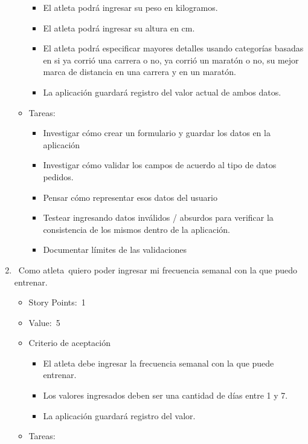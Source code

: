 \begin{enumerate}
\begin{itemize}
    \begin{itemize}
    \item
      El atleta podrá ingresar su peso en kilogramos.
    \item
      El atleta podrá ingresar su altura en cm.
    \item
      El atleta podrá especificar mayores detalles usando categorías
      basadas en si ya corrió una carrera o no, ya corrió un maratón o
      no, su mejor marca de distancia en una carrera y en un maratón.
    \item
      La aplicación guardará registro del valor actual de ambos datos.
    \end{itemize}
  \item
    Tareas:

    \begin{itemize}
    \item
      Investigar cómo crear un formulario y guardar los datos en la
      aplicación
    \item
      Investigar cómo validar los campos de acuerdo al tipo de datos
      pedidos.
    \item
      Pensar cómo representar esos datos del usuario
    \item
      Testear ingresando datos inválidos / absurdos para verificar la
      consistencia de los mismos dentro de la aplicación.
    \item
      Documentar límites de las validaciones
    \end{itemize}
  \end{itemize}
\item
  ~Como atleta~quiero poder ingresar mi frecuencia semanal con la que
  puedo entrenar.

  \begin{itemize}
  \item
    Story Points:~1
  \item
    Value:~5
  \item
    Criterio de aceptación

    \begin{itemize}
    \item
      El atleta debe ingresar la frecuencia semanal con la que puede
      entrenar.
    \item
      Los valores ingresados deben ser una cantidad de días entre 1 y 7.
    \item
      La aplicación guardará registro del valor.
    \end{itemize}
  \item
    Tareas:


\end{itemize}
\end{enumerate}

